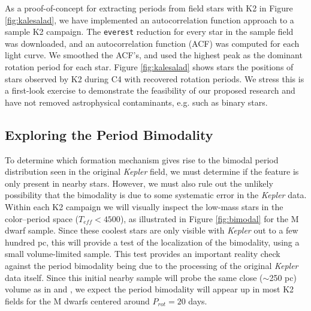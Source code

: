 \documentclass[12pt]{article}
\newcommand{\Kepler}{\textsl{Kepler}\xspace}
\begin{document}
As a proof-of-concept for extracting periods from field stars with K2 in Figure \ref{fig:kalesalad}, we have implemented an autocorrelation function approach to a sample K2 campaign. The {\tt everest} \citep{luger2016} reduction for every star in the sample field was downloaded, and an autocorrelation function (ACF) was computed for each light curve. We smoothed the ACF's, and used the highest peak as the dominant rotation period for each star.
Figure \ref{fig:kalesalad} shows stars the positions of stars observed by K2 during C4 with recovered rotation periods. We stress this is a first-look exercise to demonstrate the feasibility of our proposed research and have not removed astrophysical contaminants, e.g. such as binary stars.






\subsection{Exploring the Period Bimodality}


To determine which formation mechanism gives rise to the bimodal period distribution seen in the original \Kepler field, we must determine if the feature is only present in nearby stars. However, we must also rule out the unlikely possibility that the bimodality is due to some systematic error in the \Kepler data. Within each K2 campaign we will visually inspect the low-mass stars in the color--period space ($T_{eff}<4500$), as illustrated in Figure \ref{fig:bimodal} for the \citet{mcquillan2013} M dwarf sample. Since these coolest stars are only visible with \Kepler out to a few hundred pc, this will provide a test of the localization of the bimodality, using a small volume-limited sample. This test provides an important reality check against the period bimodality being due to the processing of the original \Kepler data itself. Since this initial nearby sample will probe the same close ($\sim$250 pc) volume as in \citet{mcquillan2013} and \citet{davenport2017}, we expect the period bimodality will appear up in most K2 fields for the M dwarfs centered around $P_{rot}=20$ days.
\end{document}
